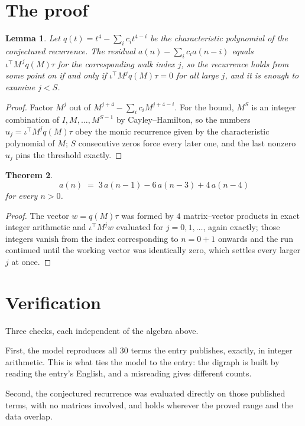 \documentclass[11pt,a4paper]{article}
\theoremstyle{plain}
\newtheorem{theorem}{Theorem}
\newtheorem{lemma}[theorem]{Lemma}
\theoremstyle{definition}
\begin{document}
\section{The proof}

\begin{lemma}\label{lem:crit}
Let $q(t)=t^{4}-\sum_i c_it^{4-i}$ be the characteristic polynomial of the
conjectured recurrence. The residual $a(n)-\sum_ic_ia(n-i)$ equals
$\iota^{\!\top}M^{\,j}q(M)\tau$ for the corresponding walk index $j$, so the recurrence
holds from some point on if and only if $\iota^{\!\top}M^{j}q(M)\tau=0$ for all large $j$,
and it is enough to examine $j<S$.
\end{lemma}

\begin{proof}
Factor $M^{j}$ out of $M^{j+4}-\sum_ic_iM^{j+4-i}$. For the bound, $M^{S}$
is an integer combination of $I,M,\dots,M^{S-1}$ by Cayley--Hamilton, so the numbers
$u_j=\iota^{\!\top}M^{j}q(M)\tau$ obey the monic recurrence given by the characteristic
polynomial of $M$; $S$ consecutive zeros force every later one, and the last nonzero $u_j$
pins the threshold exactly.
\end{proof}

\begin{theorem}
\[
a(n)\;=\;3\,a(n-1) - 6\,a(n-3) + 4\,a(n-4)
\]
for every $n>0$.
\end{theorem}

\begin{proof}
The vector $w=q(M)\tau$ was formed by $4$ matrix--vector products in exact integer
arithmetic and $\iota^{\!\top}M^{j}w$ evaluated for $j=0,1,\dots$, again exactly; those
integers vanish from the index corresponding to $n=0+1$ onwards and the run continued
until the working vector was identically zero, which settles every larger $j$ at once.
\end{proof}

\section{Verification}

Three checks, each independent of the algebra above.

First, the model reproduces all $30$ terms the entry publishes, exactly, in integer
arithmetic. This is what ties the model to the entry: the digraph is built by reading the
entry's English, and a misreading gives different counts.

Second, the conjectured recurrence was evaluated directly on those published terms, with no
matrices involved, and holds wherever the proved range and the data overlap.
\end{document}
